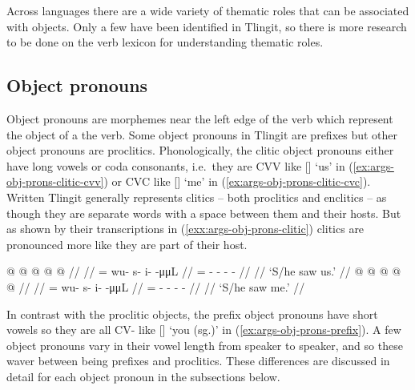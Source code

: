 Across languages there are a wide variety of thematic roles that can be associated with objects.
Only a few have been identified in Tlingit, so there is more research to be done on the verb lexicon for understanding thematic roles.

\subsection{Object pronouns}\label{sec:args-obj-prons}

Object pronouns are morphemes near the left edge of the verb which represent the object of a the verb.
Some object pronouns in Tlingit are prefixes but other object pronouns are proclitics.
Phonologically, the clitic object pronouns either have long vowels or coda consonants, i.e.\ they are CVV like  [] ‘us’ in (\ref{ex:args-obj-prons-clitic-cvv}) or CVC like  [] ‘me’ in (\ref{ex:args-obj-prons-clitic-cvc}).
Written Tlingit generally represents clitics – both proclitics and enclitics – as though they are separate words with a space between them and their hosts.
But as shown by their transcriptions in (\ref{exx:args-obj-prons-clitic}) clitics are pronounced more like they are part of their host.

\pex\label{exx:args-obj-prons-clitic}%
\a\label{ex:args-obj-prons-clitic-cvv}%
%
\begingl
	\gla	{} @  @ {} @ {} @ {} @ {} //
	\glp	\llap{[}\rlap{\ipa{\gm{hàː}w.sì.ˈtʰìːn}]} {} {} {} {} {} //
	\glb	{}= wu- s- i-  -μμL //
	\glc	{}= - - -  - //
	\gld	{}  {} {} {} {} //
	\glft	‘S/he saw us.’
		//
\endgl
\a\label{ex:args-obj-prons-clitic-cvc}%
%
\begingl
	\gla	{} @  @ {} @ {} @ {} @ {} //
	\glp	\llap{[}\rlap{\ipa{\gm{χàt}.wù.sì.ˈtʰìːn}]} {} {} {} {} {} //
	\glb	{}= wu- s- i-  -μμL //
	\glc	{}= - - -  - //
	\gld	{}  {} {} {} {} //
	\glft	‘S/he saw me.’
		//
\endgl
\xe

In contrast with the proclitic objects, the prefix object pronouns have short vowels so they are all CV- like  [] ‘you (sg.)’ in (\ref{ex:args-obj-prons-prefix}).
A few object pronouns vary in their vowel length from speaker to speaker, and so these waver between being prefixes and proclitics.
These differences are discussed in detail for each object pronoun in the subsections below.

